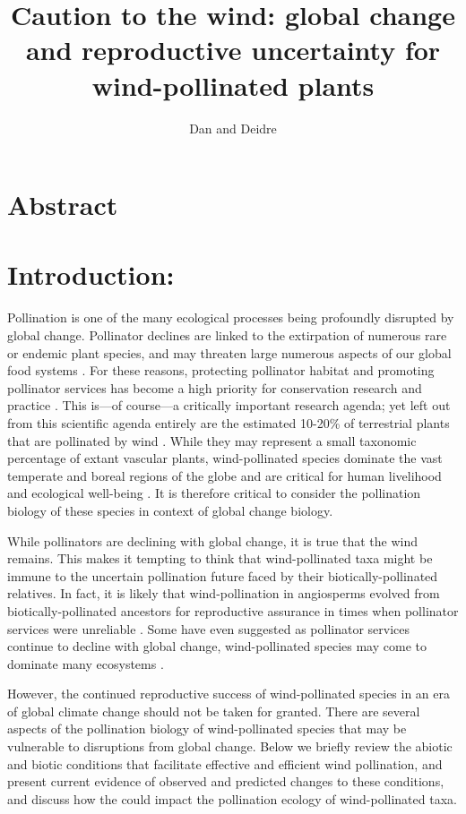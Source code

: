 \documentclass[12pt]{article}
\title{Caution to the wind: global change and reproductive uncertainty for wind-pollinated plants}\\
\author{Dan and Deidre}
\begin{document}

\maketitle

\section*{Abstract}

\section*{Introduction:}
Pollination is one of the many ecological processes being profoundly disrupted by global change\citep{Gerard:2020aa}. Pollinator declines are linked to the extirpation of numerous rare or endemic plant species, and may threaten large numerous aspects of our global food systems \citep{}. For these reasons, protecting pollinator habitat and promoting pollinator services has become a high priority for conservation research and practice  \citep{Dicks975,Kremen:2000aa}. This is---of course---a critically important research agenda; yet left out from this scientific agenda entirely are the estimated 10-20\% of terrestrial plants that are pollinated by wind \citep{Ollerton:2011aa,Friedman:2009aa,Ackerman:2000aa}. While they may represent a small taxonomic percentage of extant vascular plants, wind-pollinated species dominate the vast temperate and boreal regions of the globe and are critical for human livelihood and ecological well-being \citep{Regal:1982aa}. It is therefore critical to consider the pollination biology of these species in context of global change biology.

While pollinators are declining with global change, it is true that the wind remains. This makes it tempting to think that wind-pollinated taxa might be immune to the uncertain pollination future faced by their biotically-pollinated relatives. In fact, it is likely that wind-pollination in angiosperms evolved from biotically-pollinated ancestors for reproductive assurance in times when pollinator services were unreliable \citep{Friedman:2009aa}. Some have even suggested as pollinator services continue to decline with global change, wind-pollinated species may come to dominate many ecosystems \citep{Bond:1995aa,Hoiss:2013aa}. 

However, the continued reproductive success of wind-pollinated species in an era of global climate change should not be taken for granted. There are several aspects of the pollination biology of wind-pollinated species that may be vulnerable to disruptions from global change. Below we briefly review the abiotic and biotic conditions that facilitate effective and efficient wind pollination, and present current evidence of observed and predicted changes to these conditions, and discuss how the could impact the pollination ecology of wind-pollinated taxa.
\end{document}
